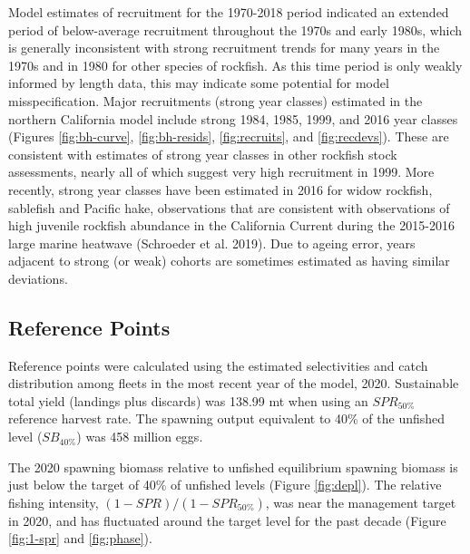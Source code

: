 \documentclass[11pt,
  english,
]{article}
\begin{document}
Model estimates of recruitment for the 1970-2018 period indicated an extended period of below-average recruitment throughout the 1970s and early 1980s, which is generally inconsistent with strong recruitment trends for many years in the 1970s and in 1980 for other species of rockfish. As this time period is only weakly informed by length data, this may indicate some potential for model misspecification. Major recruitments (strong year classes) estimated in the northern California model include strong 1984, 1985, 1999, and 2016 year classes (Figures \ref{fig:bh-curve}, \ref{fig:bh-resids}, \ref{fig:recruits}, and \ref{fig:recdevs}). These are consistent with estimates of strong year classes in other rockfish stock assessments, nearly all of which suggest very high recruitment in 1999. More recently, strong year classes have been estimated in 2016 for widow rockfish, sablefish and Pacific hake, observations that are consistent with observations of high juvenile rockfish abundance in the California Current during the 2015-2016 large marine heatwave {(Schroeder et al. 2019)\leavevmode\tagmcend\tagstructend}. Due to ageing error, years adjacent to strong (or weak) cohorts are sometimes estimated as having similar deviations.


\hypertarget{reference-points-1}{%
\subsection{Reference Points}\label{reference-points-1}}

\leavevmode\tagmcend\tagstructend

Reference points were calculated using the estimated selectivities and catch distribution among fleets in the most recent year of the model, 2020. Sustainable total yield (landings plus discards) was 138.99 mt when using an {\(SPR_{50\%}\)\leavevmode\tagmcend\tagstructend} reference harvest rate. The spawning output equivalent to 40\% of the unfished level ({\(SB_{40\%}\)\leavevmode\tagmcend\tagstructend}) was 458 million eggs.

The 2020 spawning biomass relative to unfished equilibrium spawning biomass is just below the target of 40\% of unfished levels (Figure \ref{fig:depl}). The relative fishing intensity, {\((1-SPR)/(1-SPR_{50\%})\)\leavevmode\tagmcend\tagstructend}, was near the management target in 2020, and has fluctuated around the target level for the past decade (Figure \ref{fig:1-spr} and \ref{fig:phase}).
\end{document}
